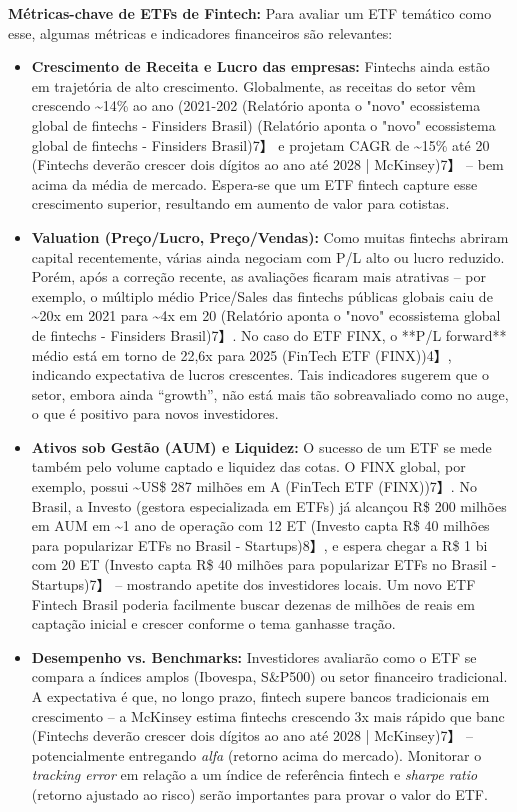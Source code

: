 \documentclass[12pt]{article}
\begin{document}
\textbf{Métricas-chave de ETFs de Fintech:} Para avaliar um ETF temático como esse, algumas métricas e indicadores financeiros são relevantes:
\begin{itemize}
\item \textbf{Crescimento de Receita e Lucro das empresas:} Fintechs ainda estão em trajetória de alto crescimento. Globalmente, as receitas do setor vêm crescendo \textasciitilde14\% ao ano (2021-202 (Relatório aponta o "novo" ecossistema global de fintechs - Finsiders Brasil) (Relatório aponta o "novo" ecossistema global de fintechs - Finsiders Brasil)7】 e projetam CAGR de \textasciitilde15\% até 20 (Fintechs deverão crescer dois dígitos ao ano até 2028 | McKinsey)7】 – bem acima da média de mercado. Espera-se que um ETF fintech capture esse crescimento superior, resultando em aumento de valor para cotistas.

\item \textbf{Valuation (Preço/Lucro, Preço/Vendas):} Como muitas fintechs abriram capital recentemente, várias ainda negociam com P/L alto ou lucro reduzido. Porém, após a correção recente, as avaliações ficaram mais atrativas – por exemplo, o múltiplo médio Price/Sales das fintechs públicas globais caiu de \textasciitilde20x em 2021 para \textasciitilde4x em 20 (Relatório aponta o "novo" ecossistema global de fintechs - Finsiders Brasil)7】. No caso do ETF FINX, o **P/L forward** médio está em torno de 22,6x para 2025 (FinTech ETF (FINX))4】, indicando expectativa de lucros crescentes. Tais indicadores sugerem que o setor, embora ainda “growth”, não está mais tão sobreavaliado como no auge, o que é positivo para novos investidores.

\item \textbf{Ativos sob Gestão (AUM) e Liquidez:} O sucesso de um ETF se mede também pelo volume captado e liquidez das cotas. O FINX global, por exemplo, possui \textasciitilde US\$ 287 milhões em A (FinTech ETF (FINX))7】. No Brasil, a Investo (gestora especializada em ETFs) já alcançou R\$ 200 milhões em AUM em \textasciitilde1 ano de operação com 12 ET (Investo capta R\$ 40 milhões para popularizar ETFs no Brasil - Startups)8】, e espera chegar a R\$ 1 bi com 20 ET (Investo capta R\$ 40 milhões para popularizar ETFs no Brasil - Startups)7】 – mostrando apetite dos investidores locais. Um novo ETF Fintech Brasil poderia facilmente buscar dezenas de milhões de reais em captação inicial e crescer conforme o tema ganhasse tração.

\item \textbf{Desempenho vs. Benchmarks:} Investidores avaliarão como o ETF se compara a índices amplos (Ibovespa, S\&P500) ou setor financeiro tradicional. A expectativa é que, no longo prazo, fintech supere bancos tradicionais em crescimento – a McKinsey estima fintechs crescendo 3x mais rápido que banc (Fintechs deverão crescer dois dígitos ao ano até 2028 | McKinsey)7】 – potencialmente entregando \textit{alfa} (retorno acima do mercado). Monitorar o \textit{tracking error} em relação a um índice de referência fintech e \textit{sharpe ratio} (retorno ajustado ao risco) serão importantes para provar o valor do ETF.


\end{itemize}
\end{document}
